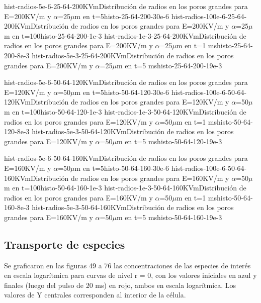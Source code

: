 \documentclass[a4paper,10pt]{article}
\begin{document}
\newcommand{\histoQuad}[3]{
	\newpage
	\imagenDobleTop
		{hist-radios-5e-6-#1-#2-#3KVm}{Distribución de radios en los poros grandes para E=#3KV/m y $\alpha$=#1$\mu$m en t=5\usec}{histo-#1-#2-#3-30e-6}
		{hist-radios-100e-6-#1-#2-#3KVm}{Distribución de radios en los poros grandes para E=#3KV/m y $\alpha$=#1$\mu$m en t=100\usec}{histo-#1-#2-#3-1e-3}
	\imagenDobleBottom
		{hist-radios-1e-3-#1-#2-#3KVm}{Distribución de radios en los poros grandes para E=#3KV/m y $\alpha$=#1$\mu$m en t=1 ms}{histo-#1-#2-#3-8e-3}
		{hist-radios-5e-3-#1-#2-#3KVm}{Distribución de radios en los poros grandes para E=#3KV/m y $\alpha$=#1$\mu$m en t=5 ms}{histo-#1-#2-#3-19e-3}
}

\histoQuad{25}{64}{200}
\histoQuad{50}{64}{120}
\histoQuad{50}{64}{160}


\clearpage
\subsection{Transporte de especies}
Se graficaron en las figuras 49 a 76 las concentraciones de las especies de interés en escala logarítmica para curvas de nivel r = 0, con los valores iniciales en azul y finales (luego del pulso de 20 ms) en rojo, ambos en escala logarítmica. Los valores de Y centrales corresponden al interior de la célula.

\end{document}

